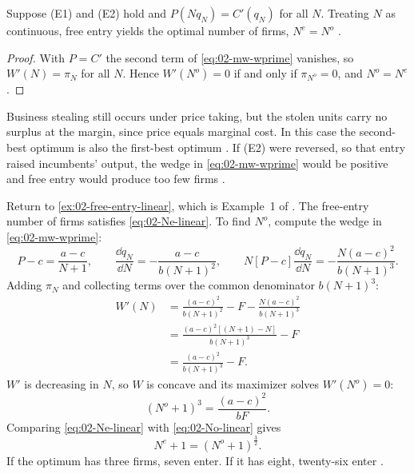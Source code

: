 \begin{corollary}\label{cor:02-mw-pricetaking}
Suppose (E1) and (E2) hold and $P(N q_N) = C'(q_N)$ for all $N$. Treating $N$ as continuous, free entry yields the
optimal number of firms, $N^e = N^o$ \citep[Corollary~1]{MankiwWhinston1986}.
\end{corollary}

\begin{proof}
With $P = C'$ the second term of \eqref{eq:02-mw-wprime} vanishes, so $W'(N) = \pi_N$ for all $N$. Hence $W'(N^o) = 0$
if and only if $\pi_{N^o} = 0$, and $N^o = N^e$.
\end{proof}

Business stealing still occurs under price taking, but the stolen units carry no surplus at the margin, since price
equals marginal cost. In this case the second-best optimum is also the first-best optimum
\citep[n.~6]{MankiwWhinston1986}. If (E2) were reversed, so that entry raised incumbents' output, the wedge in
\eqref{eq:02-mw-wprime} would be positive and free entry would produce too few firms \citep[n.~7]{MankiwWhinston1986}.

\begin{example}\label{ex:02-mw-linear}
Return to \cref{ex:02-free-entry-linear}, which is Example~1 of \citet{MankiwWhinston1986}. The free-entry number of
firms satisfies \eqref{eq:02-Ne-linear}. To find $N^o$, compute the wedge in \eqref{eq:02-mw-wprime}:
\begin{equation*}
P - c = \frac{a - c}{N + 1}, \qquad \frac{\dd q_N}{\dd N} = -\frac{a - c}{b(N + 1)^2}, \qquad
N\left[P - c\right]\frac{\dd q_N}{\dd N} = -\frac{N(a - c)^2}{b(N + 1)^3} .
\end{equation*}
Adding $\pi_N$ and collecting terms over the common denominator $b(N + 1)^3$:
\begin{align*}
W'(N) &= \frac{(a - c)^2}{b(N + 1)^2} - F - \frac{N(a - c)^2}{b(N + 1)^3} \\
&= \frac{(a - c)^2\left[(N + 1) - N\right]}{b(N + 1)^3} - F \\
&= \frac{(a - c)^2}{b(N + 1)^3} - F .
\end{align*}
$W'$ is decreasing in $N$, so $W$ is concave and its maximizer solves $W'(N^o) = 0$:
\begin{equation}\label{eq:02-No-linear}
(N^o + 1)^3 = \frac{(a - c)^2}{bF} .
\end{equation}
Comparing \eqref{eq:02-Ne-linear} with \eqref{eq:02-No-linear} gives
\begin{equation}\label{eq:02-Ne-No}
N^e + 1 = (N^o + 1)^{\frac{3}{2}} .
\end{equation}
If the optimum has three firms, seven enter. If it has eight, twenty-six enter \citep[p.~52]{MankiwWhinston1986}.
\end{example}

